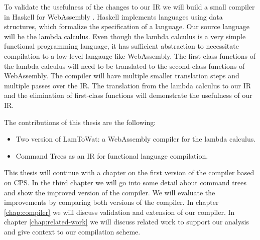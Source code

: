 To validate the usefulness of the changes to our IR we will build a small compiler in Haskell \autocite{haskellhomepage} for WebAssembly \autocite{webassemblyhomepage}. Haskell implements languages using data structures, which formalize the specification of a language. Our source language will be the lambda calculus. Even though the lambda calculus is a very simple functional programming language, it has sufficient abstraction to necessitate compilation to a low-level langauge like WebAssembly. The first-class functions of the lambda calculus will need to be translated to the second-class functions of WebAssembly. The compiler will have multiple smaller translation steps and multiple passes over the IR. The translation from the lambda calculus to our IR and the elimination of first-class functions will demonstrate the usefulness of our IR.

The contributions of this thesis are the following:
\begin{itemize}
\item Two version of LamToWat: a WebAssembly compiler for the lambda calculus.
\item Command Trees as an IR for functional language compilation.
\end{itemize}

This thesis will continue with a chapter on the first version of the compiler based on CPS. In the third chapter we will go into some detail about command trees and show the improved version of the compiler. We will evaluate the improvements by comparing both versions of the compiler. In chapter \ref{chap:compiler} we will discuss validation and extension of our compiler. In chapter \ref{chap:related-work} we will discuss related work to support our analysis and give context to our compilation scheme.